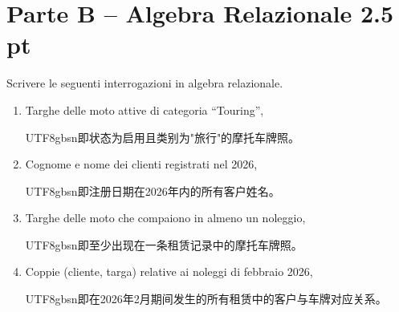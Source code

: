 \documentclass[a4paper,12pt]{article}
\begin{document}
	\section*{Parte B -- Algebra Relazionale 2.5 pt}
	
	Scrivere le seguenti interrogazioni in algebra relazionale. 
	
	\begin{enumerate}
		\item Targhe delle moto attive di categoria ``Touring'',
		\begin{CJK}{UTF8}{gbsn}即状态为启用且类别为"旅行"的摩托车牌照。\end{CJK}
		
		\item Cognome e nome dei clienti registrati nel 2026,
		\begin{CJK}{UTF8}{gbsn}即注册日期在2026年内的所有客户姓名。\end{CJK}
		
		\item Targhe delle moto che compaiono in almeno un noleggio,
		\begin{CJK}{UTF8}{gbsn}即至少出现在一条租赁记录中的摩托车牌照。\end{CJK}
		
		\item Coppie (cliente, targa) relative ai noleggi di febbraio 2026,
		\begin{CJK}{UTF8}{gbsn}即在2026年2月期间发生的所有租赁中的客户与车牌对应关系。\end{CJK}
	\end{enumerate}
	
\end{document}
